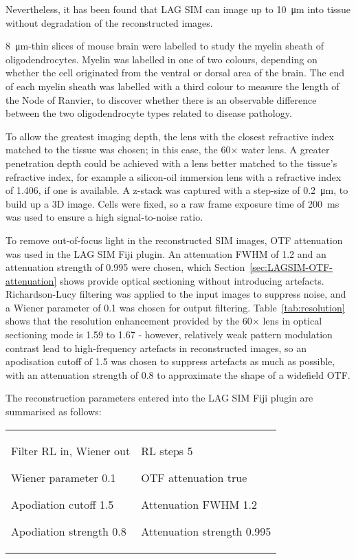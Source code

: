 Nevertheless, it has been found that LAG SIM can image up to \SI{10}{\micro\metre} into tissue without degradation of the reconstructed images.

\SI{8}{\micro\metre}-thin slices of mouse brain were labelled to study the myelin sheath of oligodendrocytes.
Myelin was labelled in one of two colours, depending on whether the cell originated from the ventral or dorsal area of the brain.
The end of each myelin sheath was labelled with a third colour to measure the length of the Node of Ranvier, to discover whether there is an observable difference between the two oligodendrocyte types related to disease pathology.

To allow the greatest imaging depth, the lens with the closest refractive index matched to the tissue was chosen; in this case, the 60$\times$ water lens.
A greater penetration depth could be achieved with a lens better matched to the tissue's refractive index, for example a silicon-oil immersion lens with a refractive index of \num{1.406}, if one is available.
A z-stack was captured with a step-size of \SI{0.2}{\micro\metre}, to build up a 3D image.
Cells were fixed, so a raw frame exposure time of \SI{200}{\milli\second} was used to ensure a high signal-to-noise ratio.

To remove out-of-focus light in the reconstructed SIM images, OTF attenuation was used in the LAG SIM Fiji plugin.
An attenuation FWHM of 1.2 and an attenuation strength of 0.995 were chosen, which Section~\ref{sec:LAGSIM-OTF-attenuation} shows provide optical sectioning without introducing artefacts.
Richardson-Lucy filtering was applied to the input images to suppress noise, and a Wiener parameter of 0.1 was chosen for output filtering.
Table~\ref{tab:resolution} shows that the resolution enhancement provided by the 60$\times$ lens in optical sectioning mode is 1.59 to 1.67 - however, relatively weak pattern modulation contrast lead to high-frequency artefacts in reconstructed images, so an apodisation cutoff of 1.5 was chosen to suppress artefacts as much as possible, with an attenuation strength of 0.8 to approximate the shape of a widefield OTF.

The reconstruction parameters entered into the LAG SIM Fiji plugin are summarised as follows:\newline
\begin{tabular}{p{}p{}}
\begin{labelling}[margin={Attenuation strength}]
	\item[Filter] RL in, Wiener out
	\item[Wiener parameter] 0.1
	\item[Apodiation cutoff] 1.5
	\item[Apodiation strength] 0.8
\end{labelling} &
\begin{labelling}[margin={Attenuation strength}]
	\item[RL steps] 5
	\item[OTF attenuation] true
	\item[Attenuation FWHM] 1.2
	\item[Attenuation strength] 0.995
\end{labelling}
\end{tabular}

